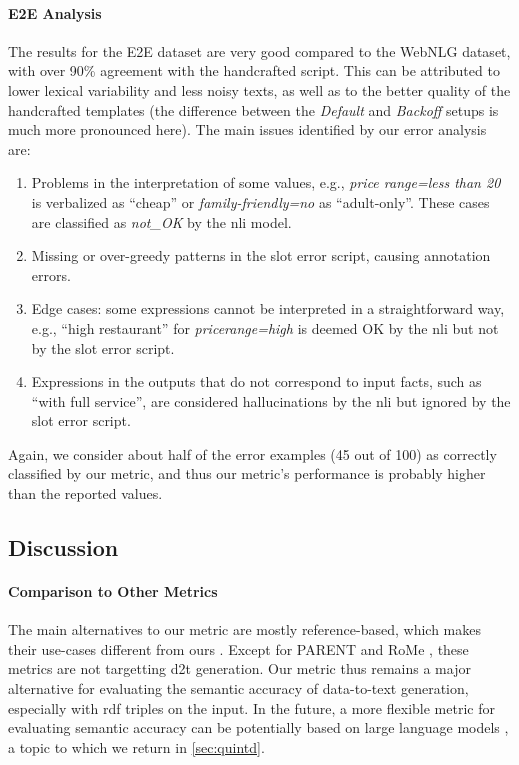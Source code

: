\paragraph{E2E Analysis} The results for the E2E dataset are very good compared to the WebNLG dataset, with over 90\% agreement with the handcrafted script. This can be attributed to lower lexical variability and less noisy texts, as well as to the better quality of the handcrafted templates (the difference between the \emph{Default} and \emph{Backoff} setups is much more pronounced here). The main issues identified by our error analysis are:
\begin{enumerate}
    \item Problems in the interpretation of some values, e.g., \textit{price range=less than \textsterling{}20} is verbalized as ``cheap'' or \textit{family-friendly=no} as ``adult-only''. These cases are classified as \emph{not\_OK} by the \ac{nli} model.
    \item Missing or over-greedy patterns in the slot error script, causing annotation errors.
    \item Edge cases: some expressions cannot be interpreted in a straightforward way, e.g., ``high restaurant'' for \emph{pricerange=high} is deemed OK by the \ac{nli} but not by the slot error script.
    \item Expressions in the outputs that do not correspond to input facts, such as ``with full service'', are considered hallucinations by the \ac{nli} but ignored by the slot error script.
\end{enumerate}
Again, we consider about half of the error examples (45 out of 100) as correctly classified by our metric, and thus our metric's performance is probably higher than the reported values.

\subsection{Discussion}

\paragraph{Comparison to Other Metrics} The main alternatives to our metric are mostly reference-based, which makes their use-cases different from ours \cite{zhaoMoverScoreTextGeneration2019,sellam2020bleurt,yuanBARTScoreEvaluatingGenerated2021}. Except for PARENT \cite{dhingraHandlingDivergentReference2019} and RoMe \cite{ronyRoMeRobustMetric2022}, these metrics are not targetting \ac{d2t} generation. Our metric thus remains a major alternative for evaluating the semantic accuracy of data-to-text generation, especially with \ac{rdf} triples on the input. In the future, a more flexible metric for evaluating semantic accuracy can be potentially based on large language models \cite{zhaoInvestigatingTabletoTextGeneration2023,sottanaEvaluationMetricsEra2023,kocmiLargeLanguageModels2023}, a topic to which we return in \autoref{sec:quintd}.

